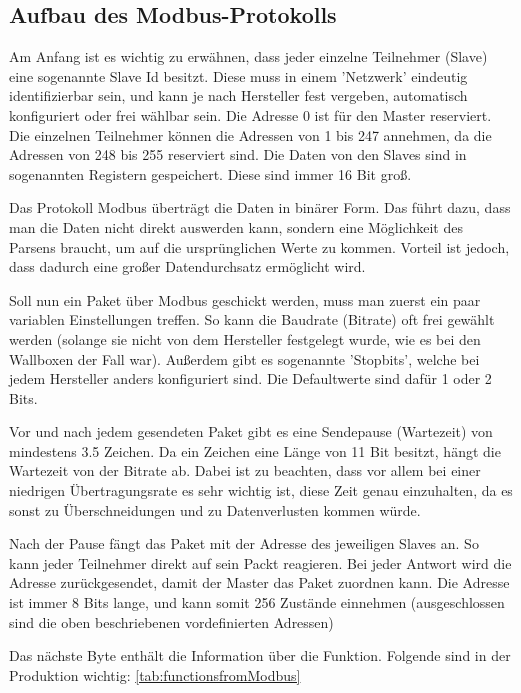 \subsection{Aufbau des Modbus-Protokolls}
Am Anfang ist es wichtig zu erwähnen, dass jeder einzelne Teilnehmer (Slave) eine sogenannte Slave Id besitzt. Diese muss in einem 'Netzwerk' eindeutig identifizierbar sein, und kann je nach Hersteller fest vergeben, automatisch konfiguriert oder frei wählbar sein. Die Adresse 0 ist für den Master reserviert. Die einzelnen Teilnehmer können die Adressen von 1 bis 247 annehmen, da die Adressen von 248 bis 255 reserviert sind. Die Daten von den Slaves sind in sogenannten Registern gespeichert. Diese sind immer 16 Bit groß.  

Das Protokoll Modbus überträgt die Daten in binärer Form. Das führt dazu, dass man die Daten nicht direkt auswerden kann, sondern eine Möglichkeit des Parsens braucht, um auf die ursprünglichen Werte zu kommen. Vorteil ist jedoch, dass dadurch eine großer Datendurchsatz ermöglicht wird. 

 

Soll nun ein Paket über Modbus geschickt werden, muss man zuerst ein paar variablen Einstellungen treffen. So kann die Baudrate (Bitrate) oft frei gewählt werden (solange sie nicht von dem Hersteller festgelegt wurde, wie es bei den Wallboxen der Fall war). Außerdem gibt es sogenannte 'Stopbits', welche bei jedem Hersteller anders konfiguriert sind. Die Defaultwerte sind dafür 1 oder 2 Bits. 

 

Vor und nach jedem gesendeten Paket gibt es eine Sendepause (Wartezeit) von mindestens 3.5 Zeichen. Da ein Zeichen eine Länge von 11 Bit besitzt, hängt die Wartezeit von der Bitrate ab. Dabei ist zu beachten, dass vor allem bei einer niedrigen Übertragungsrate es sehr wichtig ist, diese Zeit genau einzuhalten, da es sonst zu Überschneidungen und zu Datenverlusten kommen würde.  

Nach der Pause fängt das Paket mit der Adresse des jeweiligen Slaves an. So kann jeder Teilnehmer direkt auf sein Packt reagieren. Bei jeder Antwort wird die Adresse zurückgesendet, damit der Master das Paket zuordnen kann. Die Adresse ist immer 8 Bits lange, und kann somit 256 Zustände einnehmen (ausgeschlossen sind die oben beschriebenen vordefinierten Adressen) 

Das nächste Byte enthält die Information über die Funktion. Folgende sind in der Produktion wichtig: \ref{tab:functionsfromModbus}

